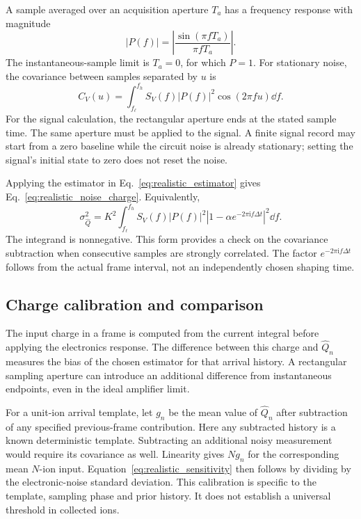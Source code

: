 A sample averaged over an acquisition aperture $T_a$ has a frequency response with magnitude
\begin{equation}
 |P(f)|=\left|\frac{\sin(\pi fT_a)}{\pi fT_a}\right|.
\end{equation}
The instantaneous-sample limit is $T_a=0$, for which $P=1$. For stationary noise, the covariance between samples separated by $u$ is
\begin{equation}
 C_V(u)=\int_{f_{\ell}}^{f_h}S_V(f)|P(f)|^2
 \cos(2\pi fu)\dd f.
 \label{eq:app_realistic_covariance}
\end{equation}
For the signal calculation, the rectangular aperture ends at the stated sample time. The same aperture must be applied to the signal. A finite signal record may start from a zero baseline while the circuit noise is already stationary; setting the signal's initial state to zero does not reset the noise.

Applying the estimator in Eq.~\eqref{eq:realistic_estimator} gives Eq.~\eqref{eq:realistic_noise_charge}. Equivalently,
\begin{equation}
 \sigma_{\widehat Q}^{2}=K^2\int_{f_{\ell}}^{f_h}
 S_V(f)|P(f)|^2\left|1-\alpha e^{-2\pi\mathrm{i}f\Delta t}\right|^2\dd f.
 \label{eq:app_realistic_noise_integral}
\end{equation}
The integrand is nonnegative. This form provides a check on the covariance subtraction when consecutive samples are strongly correlated. The factor $e^{-2\pi\mathrm{i}f\Delta t}$ follows from the actual frame interval, not an independently chosen shaping time.

\subsection{Charge calibration and comparison}

The input charge in a frame is computed from the current integral before applying the electronics response. The difference between this charge and $\widehat Q_n$ measures the bias of the chosen estimator for that arrival history. A rectangular sampling aperture can introduce an additional difference from instantaneous endpoints, even in the ideal amplifier limit.

For a unit-ion arrival template, let $g_n$ be the mean value of $\widehat Q_n$ after subtraction of any specified previous-frame contribution. Here any subtracted history is a known deterministic template. Subtracting an additional noisy measurement would require its covariance as well. Linearity gives $N g_n$ for the corresponding mean $N$-ion input. Equation~\eqref{eq:realistic_sensitivity} then follows by dividing by the electronic-noise standard deviation. This calibration is specific to the template, sampling phase and prior history. It does not establish a universal threshold in collected ions.


